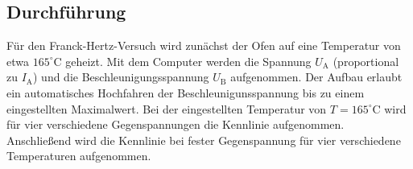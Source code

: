 \subsection{Durchführung}
Für den Franck-Hertz-Versuch wird zunächst der Ofen auf eine Temperatur von etwa $165^\circ$C geheizt. Mit dem Computer werden die Spannung $U_\mathrm{A}$ (proportional zu $I_\mathrm{A}$) und die Beschleunigungsspannung $U_\mathrm{B}$ aufgenommen. Der Aufbau erlaubt ein automatisches Hochfahren der Beschleunigunsspannung bis zu einem eingestellten Maximalwert. Bei der eingestellten Temperatur von $T=165^\circ$C wird für vier verschiedene Gegenspannungen die Kennlinie aufgenommen. Anschließend wird die Kennlinie bei fester Gegenspannung für vier verschiedene Temperaturen aufgenommen.
